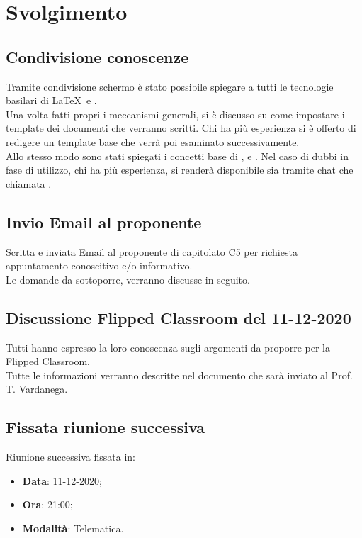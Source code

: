 \documentclass[]{article}
\begin{document}
\newpage

\section{Svolgimento}
\subsection{Condivisione conoscenze}
Tramite condivisione schermo è stato possibile spiegare a tutti le tecnologie basilari di \LaTeX\ e . \\
Una volta fatti propri i meccanismi generali, si è discusso su come impostare i template dei documenti che verranno scritti. Chi ha più esperienza si è offerto di redigere un template base che verrà poi esaminato successivamente.\\
Allo stesso modo sono stati spiegati i concetti base di ,  e . Nel caso di dubbi in fase di utilizzo, chi ha più esperienza, si renderà disponibile sia tramite chat che chiamata .

\subsection{Invio Email al proponente}
Scritta e inviata Email al proponente di capitolato C5 per richiesta appuntamento conoscitivo e/o informativo. \\
Le domande da sottoporre, verranno discusse in seguito.

\subsection{Discussione Flipped Classroom del 11-12-2020}
Tutti hanno espresso la loro conoscenza sugli argomenti da proporre per la Flipped Classroom.\\
Tutte le informazioni verranno descritte nel documento che sarà inviato al Prof. T. Vardanega.
\subsection{Fissata riunione successiva}
Riunione successiva fissata in:
\begin{itemize}
	\item \textbf{Data}: 11-12-2020;
	\item \textbf{Ora}: 21:00;
	\item \textbf{Modalità}: Telematica.
\end{itemize}
\end{document}
